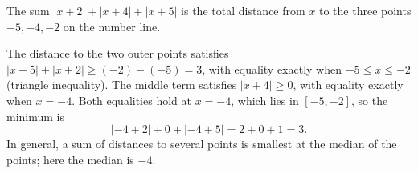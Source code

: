 The sum $|x+2|+|x+4|+|x+5|$ is the total distance from $x$ to the three points $-5,-4,-2$ on the number line.

The distance to the two outer points satisfies $|x+5|+|x+2|\ge(-2)-(-5)=3$, with equality exactly when $-5\le x\le-2$ (triangle inequality). The middle term satisfies $|x+4|\ge0$, with equality exactly when $x=-4$. Both equalities hold at $x=-4$, which lies in $[-5,-2]$, so the minimum is
\[
|{-4}+2|+0+|{-4}+5|=2+0+1=\boxed{3}.
\]
In general, a sum of distances to several points is smallest at the median of the points; here the median is $-4$.
